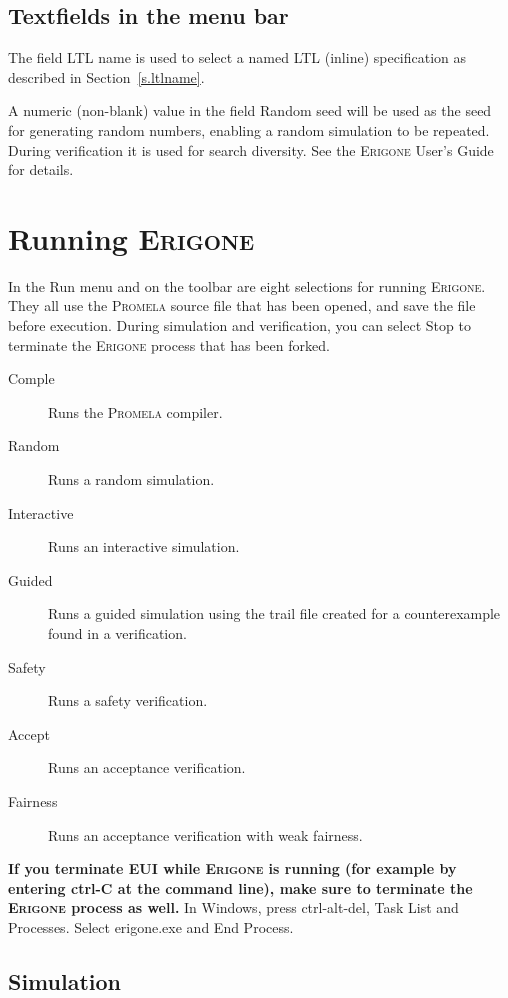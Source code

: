 \documentclass[11pt]{article}
\newcommand{\eri}{\textsc{Erigone}}
\newcommand{\prm}{\textsc{Promela}}
\newcommand{\eui}{\textsc{EUI}}
\newcommand{\bu}[1]{\textsf{#1}}
\begin{document}
\subsection{Textfields in the menu bar}

The field \bu{LTL name} is used to select a named LTL (inline)
specification as described in Section~\ref{s.ltlname}.

A numeric (non-blank) value in the field \bu{Random seed} will be used as the
seed for generating random numbers, enabling a random simulation to be
repeated. During verification it is used for search diversity. See the
\eri{} User's Guide for details.

\newpage

\section{Running \eri{}}\label{s.run}
In the \bu{Run} menu and on the toolbar are eight selections for
running \eri{}. They all use the \prm{} source file that has been opened,
and save the file before execution.
During simulation and verification,
you can select \bu{Stop} to terminate the \eri{} process that has been forked.
\begin{description}
\item[\bu{Comple}] Runs the \prm{} compiler.
\item[\bu{Random}] Runs a random simulation.
\item[\bu{Interactive}] Runs an interactive simulation.
\item[\bu{Guided}] Runs a guided simulation using the trail
file created for a counterexample found in a verification.
\item[\bu{Safety}] Runs a safety verification.
\item[\bu{Accept}] Runs an acceptance verification.
\item[\bu{Fairness}] Runs an acceptance verification with weak fairness.
\end{description}

\textbf{If you terminate \eui{} while \eri{} is running (for example by
entering \bu{ctrl-C} at the command line), make sure to terminate the
\eri{} process as well.} In Windows, press \bu{ctrl-alt-del}, \bu{Task
List} and \bu{Processes}. Select \bu{erigone.exe} and \bu{End Process}.

\subsection{Simulation}\label{s.sim}
\end{document}
